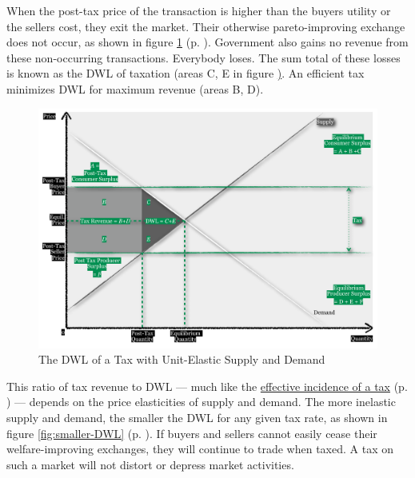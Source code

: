 When the post-tax price of the transaction is higher than the buyers utility or the sellers cost, they exit the market. Their otherwise pareto-improving exchange does not occur, as shown in figure \ref{fig:DWL} (p. \pageref{fig:DWL}). Government also gains no revenue from these non-occurring transactions. Everybody loses. The sum total of these losses is known as the \gls{DWL} of taxation (areas C, E in figure \href{fig:DWL}). An efficient tax minimizes \gls{DWL} for maximum revenue (areas B, D).

\begin{figure}[htbp]
	\centering
	\includegraphics[width=1\textwidth]{./img/DWL}  
	\caption[Deadweight-Loss of a Tax with Unit-Elastic Supply and Demand]{The \gls{DWL} of a Tax with Unit-Elastic Supply and Demand}
	\label{fig:DWL}
\end{figure}

This ratio of tax revenue to \gls{DWL} --- much like the \hyperref[sec:well-determinedincidence]{effective incidence of a tax} (p. \pageref{sec:well-determinedincidence}) --- depends on the price elasticities of supply and demand. The more inelastic supply and demand, the smaller the \gls{DWL} for any given tax rate, as shown in figure \ref{fig:smaller-DWL} (p. \pageref{fig:smaller-DWL}). If buyers and sellers cannot easily cease their welfare-improving exchanges, they will continue to trade when taxed. A tax on such a market will not distort or depress market activities.

